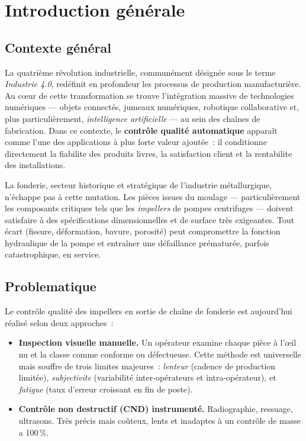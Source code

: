 \documentclass[12pt,a4paper,openany]{report}
\begin{document}
\listoftables
{}
\thispagestyle{fancy}

\printglossary[type=\acronymtype,title={Liste des acronymes},toctitle={Liste des acronymes}]

\chapter{Introduction générale}

\section{Contexte général}

La quatrième révolution industrielle, communément désignée sous le terme \emph{Industrie 4.0}, redéfinit en profondeur les processus de production manufacturière. Au c\oe ur de cette transformation se trouve l'intégration massive de technologies numériques --- objets connectés, jumeaux numériques, robotique collaborative et, plus particulièrement, \emph{intelligence artificielle} --- au sein des chaînes de fabrication. Dans ce contexte, le \textbf{contrôle qualité automatique} apparaît comme l'une des applications à plus forte valeur ajoutée~: il conditionne directement la fiabilite des produits livres, la satisfaction client et la rentabilite des installations.

La fonderie, secteur historique et stratégique de l'industrie métallurgique, n'échappe pas à cette mutation. Les pièces issues du moulage --- particulièrement les composants critiques tels que les \emph{impellers} de pompes centrifuges --- doivent satisfaire à des spécifications dimensionnelles et de surface très exigeantes. Tout écart (fissure, déformation, bavure, porosité) peut compromettre la fonction hydraulique de la pompe et entraîner une défaillance prématurée, parfois catastrophique, en service.

\section{Problematique}

Le contrôle qualité des impellers en sortie de chaîne de fonderie est aujourd'hui réalisé selon deux approches~:

\begin{itemize}
    \item \textbf{Inspection visuelle manuelle.} Un opérateur examine chaque pièce à l'\oe il nu et la classe comme conforme ou défectueuse. Cette méthode est universelle mais souffre de trois limites majeures~: \emph{lenteur} (cadence de production limitée), \emph{subjectivite} (variabilité inter-opérateurs et intra-opérateur), et \emph{fatigue} (taux d'erreur croissant en fin de poste).
    \item \textbf{Contrôle non destructif (CND) instrumenté.} Radiographie, ressuage, ultrasons. Très précis mais coûteux, lents et inadaptes à un contrôle de masse a 100\,\%.
\end{itemize}
\end{document}
